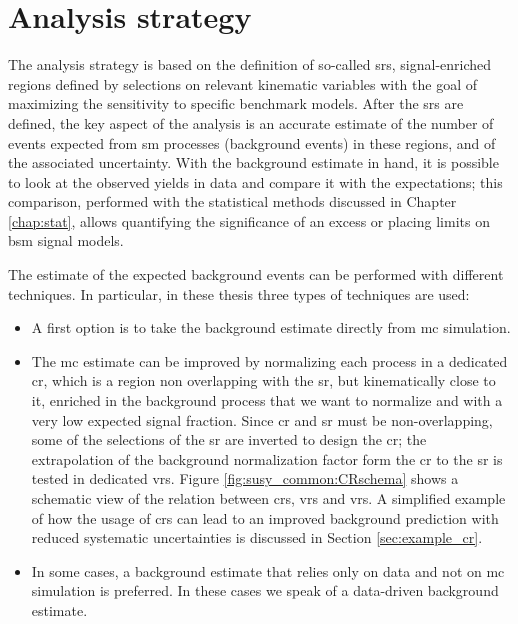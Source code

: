 \section{Analysis strategy}
\label{sec:analysisstrategy}

The analysis strategy is based on the definition of so-called \glspl{sr}, signal-enriched regions defined by selections on relevant kinematic variables with the goal of maximizing the sensitivity to specific benchmark models. 
After the \glspl{sr} are defined, the key aspect of the analysis is an accurate estimate of the number of events expected from \gls{sm} processes (background events) in these regions, and of the associated uncertainty. 
With the background estimate in hand, it is possible to look at the observed yields in data and compare it with the expectations;
this comparison, performed with the statistical methods discussed in Chapter \ref{chap:stat}, allows quantifying the significance of an excess or placing limits on \gls{bsm} signal models.

The estimate of the expected background events can be performed with different techniques. In particular, in these thesis three types of techniques are used:
\begin{itemize}
\item A first option is to take the background estimate directly from \gls{mc} simulation. 
\item The \gls{mc} estimate can be improved by normalizing each process in a dedicated \gls{cr}, which is a region non overlapping with the \gls{sr}, but kinematically close to it, enriched in the background process that we want to normalize and with a very low expected signal fraction. Since \gls{cr} and \gls{sr} must be non-overlapping, some of the selections of the \gls{sr} are inverted to design the \gls{cr}; the extrapolation of the background normalization factor form the \gls{cr} to the \gls{sr} is tested in dedicated \glspl{vr}. Figure \ref{fig:susy_common:CRschema} shows a schematic view of the relation between \glspl{cr}, \glspl{vr} and \glspl{vr}. A simplified example of how the usage of \glspl{cr} can lead to an improved background prediction with reduced systematic uncertainties is discussed in Section \ref{sec:example_cr}. 
\item In some cases, a background estimate that relies only on data and not on \gls{mc} simulation is preferred. In these cases we speak of a data-driven background estimate.
\end{itemize}

